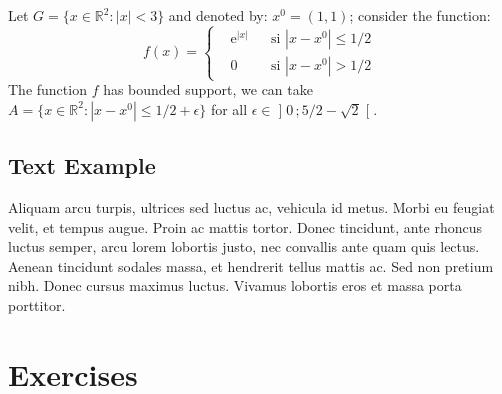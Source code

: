 \documentclass[
	11pt,
	fleqn,
	a4paper,
]{LegrandOrangeBook}
\begin{document}
\begin{example} %
    Let $G=\{x\in\mathbb{R}^2:|x|<3\}$ and denoted by: $x^0=(1,1)$; consider the function:
    \begin{equation}
        f(x)=\left\{\begin{aligned}                                                                                                                                                                                                                                                                                            & \mathrm{e}^{|x|} &  & \text{si $|x-x^0|\leq 1/2$} \\
                                                                                                                                                                                                                                                                                                           & 0                &  & \text{si $|x-x^0|> 1/2$}\end{aligned}\right.
    \end{equation}
    The function $f$ has bounded support, we can take $A=\{x\in\mathbb{R}^2:|x-x^0|\leq 1/2+\epsilon\}$ for all $\epsilon\in\mathopen{]}0\,;5/2-\sqrt{2}\mathclose{[}$.
\end{example}

\subsection{Text Example}

\begin{example}[Example name] %
    Aliquam arcu turpis, ultrices sed luctus ac, vehicula id metus. Morbi eu feugiat velit, et tempus augue. Proin ac mattis tortor. Donec tincidunt, ante rhoncus luctus semper, arcu lorem lobortis justo, nec convallis ante quam quis lectus. Aenean tincidunt sodales massa, et hendrerit tellus mattis ac. Sed non pretium nibh. Donec cursus maximus luctus. Vivamus lobortis eros et massa porta porttitor.
\end{example}


\section{Exercises}
\end{document}
